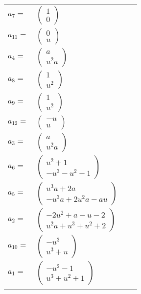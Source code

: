 \documentclass[1p]{elsarticle_modified}
\theoremstyle{definition}
\begin{document}
\begin{tabular}{m{7pt} m{180pt} m{7pt} m{180pt} }
\flushright $a_{7}=$&$\begin{pmatrix}1\\0\end{pmatrix}$ \\
\flushright $a_{11}=$&$\begin{pmatrix}0\\u\end{pmatrix}$ \\
\flushright $a_{4}=$&$\begin{pmatrix}a\\u^2 a\end{pmatrix}$ \\
\flushright $a_{8}=$&$\begin{pmatrix}1\\u^2\end{pmatrix}$ \\
\flushright $a_{9}=$&$\begin{pmatrix}1\\u^2\end{pmatrix}$ \\
\flushright $a_{12}=$&$\begin{pmatrix}- u\\u\end{pmatrix}$ \\
\flushright $a_{3}=$&$\begin{pmatrix}a\\u^2 a\end{pmatrix}$ \\
\flushright $a_{6}=$&$\begin{pmatrix}u^2+1\\- u^3- u^2-1\end{pmatrix}$ \\
\flushright $a_{5}=$&$\begin{pmatrix}u^3 a+2 a\\- u^3 a+2 u^2 a- a u\end{pmatrix}$ \\
\flushright $a_{2}=$&$\begin{pmatrix}-2 u^2+a- u-2\\u^2 a+u^3+u^2+2\end{pmatrix}$ \\
\flushright $a_{10}=$&$\begin{pmatrix}- u^3\\u^3+u\end{pmatrix}$ \\
\flushright $a_{1}=$&$\begin{pmatrix}- u^2-1\\u^3+u^2+1\end{pmatrix}$\\&\end{tabular}
\end{document}
